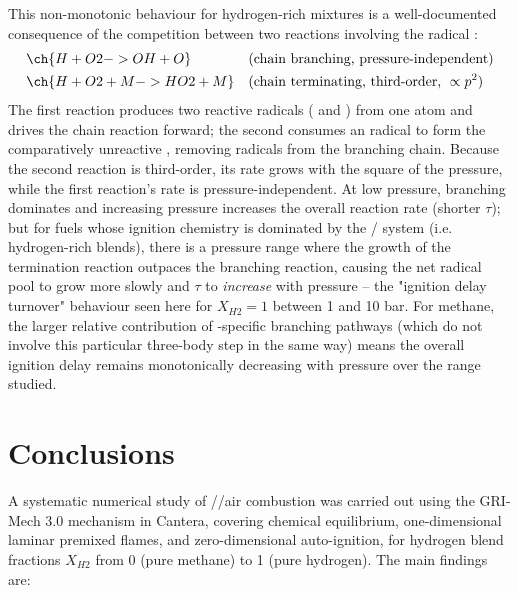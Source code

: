 \documentclass[11pt,a4paper]{article}
\begin{document}
This non-monotonic behaviour for hydrogen-rich mixtures is a well-documented consequence of the competition between
two reactions involving the  radical \cite{donohoe2014}:
\begin{align}
    &\ch{H + O2 -> OH + O} && \text{(chain branching, pressure-independent)} \\
    &\ch{H + O2 + M -> HO2 + M} && \text{(chain terminating, third-order, } \propto p^2 \text{)}
\end{align}
The first reaction produces two reactive radicals ( and ) from one  atom and drives the chain
reaction forward; the second consumes an  radical to form the comparatively unreactive , removing
radicals from the branching chain. Because the second reaction is third-order, its rate grows with the square of
the pressure, while the first reaction's rate is pressure-independent. At low pressure, branching dominates and
increasing pressure increases the overall reaction rate (shorter $\tau$); but for fuels whose ignition chemistry is
dominated by the / system (i.e. hydrogen-rich blends), there is a pressure range where the growth of
the termination reaction outpaces the branching reaction, causing the net radical pool to grow more slowly and
$\tau$ to \emph{increase} with pressure -- the "ignition delay turnover" behaviour seen here for $X_{H2}=1$ between 1
and 10 bar. For methane, the larger relative contribution of -specific branching pathways (which do not
involve this particular three-body step in the same way) means the overall ignition delay remains monotonically
decreasing with pressure over the range studied.

\section{Conclusions}

A systematic numerical study of //air combustion was carried out using the GRI-Mech 3.0 mechanism in
Cantera, covering chemical equilibrium, one-dimensional laminar premixed flames, and zero-dimensional auto-ignition,
for hydrogen blend fractions $X_{H2}$ from 0 (pure methane) to 1 (pure hydrogen). The main findings are:
\end{document}
